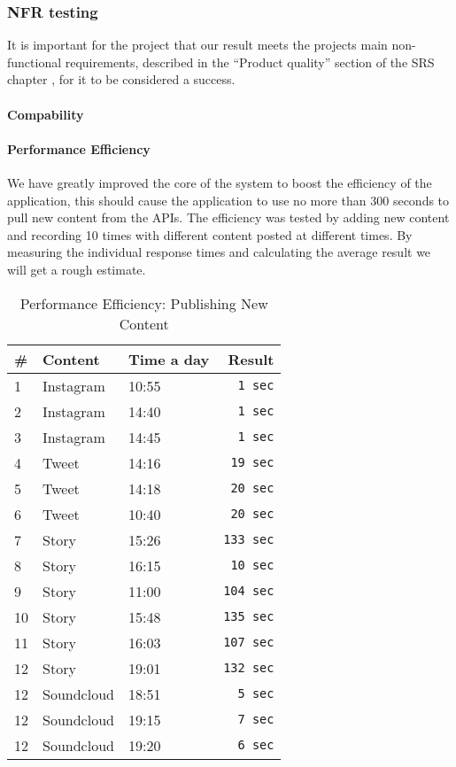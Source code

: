 \subsubsection{NFR testing}
It is important for the project that our result meets the projects main non-functional requirements, described in the ``Product quality'' section of the SRS chapter , for it to be considered a success. 

\paragraph{Compability}

\paragraph{Performance Efficiency}
We have greatly improved the core of the system to boost the efficiency of the application, this should cause the application to use no more than 300 seconds to pull new content from the APIs. The efficiency was tested by adding new content and recording 10 times with different content posted at different times. By measuring the individual response times and calculating the average result we will get a rough estimate.\\

\begin{table}[!htp]
\begin{center}
	\begin{tabular}{ | l | l | l | r | }
	\hline
	 \#	 	& Content 		& Time a day 		& Result \\ \hline
	 1		&Instagram		& 10:55			& \texttt{1 sec} \\ \hline
	 2		&Instagram		& 14:40			& \texttt{1 sec} \\ \hline
	 3		&Instagram		& 14:45			& \texttt{1 sec} \\ \hline
	 4		&Tweet		& 14:16			& \texttt{19 sec} \\ \hline
	 5		&Tweet		& 14:18			& \texttt{20 sec} \\ \hline
	 6		&Tweet		& 10:40			& \texttt{20 sec} \\ \hline
	 7		&Story		& 15:26			& \texttt{133 sec}\\ \hline
	 8		&Story		& 16:15			& \texttt{10 sec}\\ \hline
	 9		&Story 		& 11:00			& \texttt{104 sec}\\ \hline
	 10		&Story		& 15:48			& \texttt{135 sec}\\ \hline
	 11		&Story		& 16:03			& \texttt{107 sec}\\ \hline
	 12		&Story		& 19:01			& \texttt{132 sec}\\ \hline
	 12		&Soundcloud		& 18:51			& \texttt{5 sec}\\ \hline
	 12		&Soundcloud		& 19:15			& \texttt{7 sec}\\ \hline
	 12		&Soundcloud		& 19:20			& \texttt{6 sec}\\  
	 \hline
 	 \end{tabular}
\end{center}
\caption{Performance Efficiency: Publishing New Content}
\label{tab:Performance Efficiency: Publishing New Content}
\end{table}

